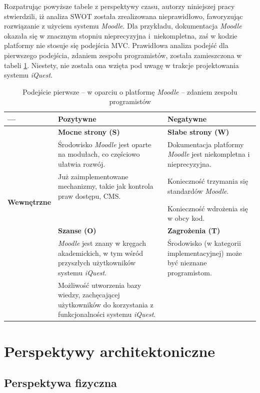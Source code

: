 Rozpatrując powyższe tabele z perspektywy czasu, autorzy niniejszej pracy stwierdzili, iż analiza SWOT została zrealizowana nieprawidłowo, faworyzując rozwiązanie z użyciem systemu \textit{Moodle}. Dla przykładu, dokumentacja \textit{Moodle} okazała się w znacznym stopniu nieprecyzyjna i~niekompletna, zaś w kodzie platformy nie stosuje się podejścia MVC. Prawidłowa analiza podejść dla pierwszego podejścia, zdaniem zespołu programistów, została zamieszczona w tabeli \ref{tab:SWOT3}. Niestety, nie została ona wzięta pod uwagę w trakcje projektowania systemu \textit{iQuest}.

\begin{table}[H]
\centering
\begin{tabular}{ | p{2.5cm} | p{5.5cm} | p{5.5cm} | }
\hline
--- & \textbf{Pozytywne} & \textbf{Negatywne} \\ \hline
\multirow{6}{*}{\textbf{Wewnętrzne}} & \textbf{Mocne strony (S)} & \textbf{Słabe strony (W)} \\
			& Środowisko \textit{Moodle} jest oparte na modułach, co częściowo ułatwia rozwój. & Dokumentacja platformy \textit{Moodle}\cite{Man:Moodle} jest niekompletna i nieprecyzyjna. \\
			& Już zaimplementowane mechanizmy, takie jak kontrola praw dostępu, CMS. & Konieczność trzymania się standardów \textit{Moodle}. \\
			& & Konieczność wdrożenia się w obcy kod. \\ \hline
%					
\multirow{3}{*}{\textbf{Zewnętrzne}} & \textbf{Szanse (O)} & \textbf{Zagrożenia (T)} \\
				& \textit{Moodle} jest znany w kręgach akademickich, w tym wśród przyszłych użytkowników systemu \textit{iQuest}. & Środowisko (w kategorii implementacyjnej) może być nieznane programistom. \\
				& Możliwość utworzenia bazy wiedzy, zachęcającej użytkowników do korzystania z funkcjonalności systemu \textit{iQuest}. & \\ \hline
\end{tabular}
\caption{Podejście pierwsze -- w oparciu o platformę \textit{Moodle} -- zdaniem zespołu programistów}\label{tab:SWOT3}
\end{table}

\section{Perspektywy architektoniczne}
\label{Chapter54}

\subsection{Perspektywa fizyczna}
\label{Chapter541}

